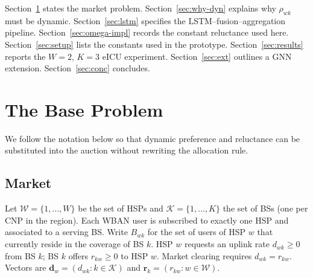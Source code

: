 \documentclass[journal,a4paper,10pt]{IEEEtran}
\begin{document}
Section~\ref{sec:base} states the market problem. Section~\ref{sec:why-dyn} explains why \(\rho_{wk}\) must be dynamic. Section~\ref{sec:lstm} specifies the LSTM--fusion--aggregation pipeline. Section~\ref{sec:omega-impl} records the constant reluctance used here. Section~\ref{sec:setup} lists the constants used in the prototype. Section~\ref{sec:results} reports the \(W=2\), \(K=3\) eICU experiment. Section~\ref{sec:ext} outlines a GNN extension. Section~\ref{sec:conc} concludes.

\section{The Base Problem}
\label{sec:base}

We follow the notation below so that dynamic preference and reluctance can be substituted into the auction without rewriting the allocation rule.

\subsection{Market}
Let \(\mathcal{W}=\{1,\ldots,W\}\) be the set of HSPs and \(\mathcal{K}=\{1,\ldots,K\}\) the set of BSs (one per CNP in the region). Each WBAN user is subscribed to exactly one HSP and associated to a serving BS. Write \(B_{wk}\) for the set of users of HSP \(w\) that currently reside in the coverage of BS \(k\). HSP \(w\) requests an uplink rate \(d_{wk}\ge 0\) from BS \(k\); BS \(k\) offers \(r_{kw}\ge 0\) to HSP \(w\). Market clearing requires \(d_{wk}=r_{kw}\). Vectors are \(\mathbf{d}_w=(d_{wk}:k\in\mathcal{K})\) and \(\mathbf{r}_k=(r_{kw}:w\in\mathcal{W})\).
\end{document}
